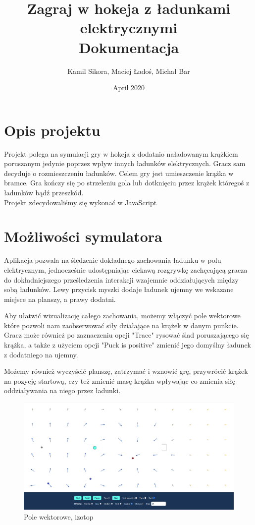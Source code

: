 \documentclass{article}
\title{ Zagraj w hokeja z ładunkami elektrycznymi \\
\large Dokumentacja}
\author{Kamil Sikora,
Maciej Ładoś,
Michał Bar}
\date{April 2020}
\begin{document}
\maketitle

\newpage
\tableofcontents

\newpage

\section{Opis projektu}
Projekt polega na symulacji gry w hokeja z dodatnio naładowanym krążkiem poruszanym jedynie poprzez wpływ innych ładunków elektrycznych. Gracz sam decyduje o rozmieszczeniu ładunków. Celem gry jest umieszczenie krążka w bramce. Gra kończy się po strzeleniu gola lub dotknięciu przez krążek któregoś z ładunków bądź przeszkód.\\
Projekt zdecydowaliśmy się wykonać w JavaScript

\section{Możliwości symulatora}

Aplikacja pozwala na śledzenie dokładnego zachowania ładunku w polu elektrycznym, jednocześnie udostępniając ciekawą rozgrywkę zachęcającą gracza do dokładniejszego prześledzenia interakcji wzajemnie oddziałujących między sobą ładunków. Lewy przycisk myszki dodaje ładunek ujemny we wskazane miejsce na planszy, a prawy dodatni.

Aby ułatwić wizualizację całego zachowania, możemy włączyć pole wektorowe które pozwoli nam zaobserwować siły działające na krążek w danym punkcie. Gracz może również po zaznaczeniu opcji "Trace" rysować ślad poruszającego się krążka, a także z użyciem opcji "Puck is positive" zmienić jego domyślny ładunek z dodatniego na ujemny.

Możemy również wyczyścić planszę, zatrzymać i wznowić grę, przywrócić krążek na pozycję startową, czy też zmienić masę krążka wpływając co zmienia siłę oddziaływania na niego przez ładunki.

\begin{figure}[H]
    \centering
    \includegraphics[width=\textwidth,height=\textheight,keepaspectratio]{img/field.png}
    \caption{Pole wektorowe, izotop}
    \label{fig:vector_drawing}
\end{figure}
\end{document}

